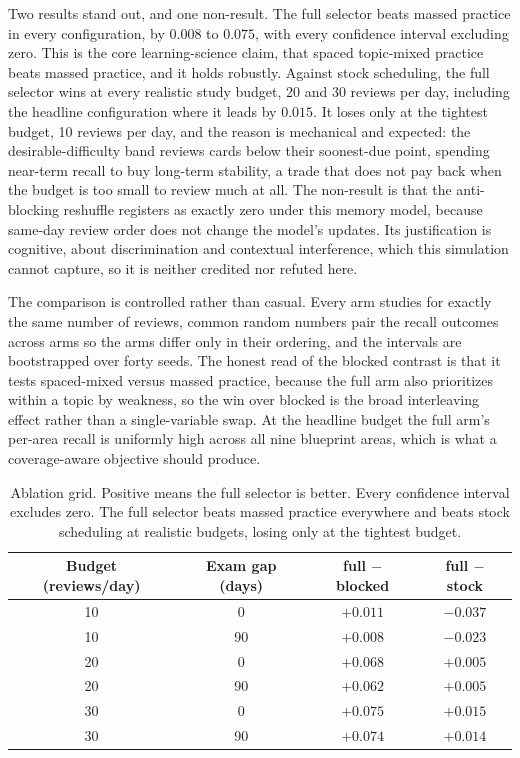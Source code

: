 \documentclass[11pt]{article}
\begin{document}
Two results stand out, and one non-result. The full selector beats massed practice in
every configuration, by $0.008$ to $0.075$, with every confidence interval excluding
zero. This is the core learning-science claim, that spaced topic-mixed practice beats
massed practice, and it holds robustly. Against stock scheduling, the full selector
wins at every realistic study budget, 20 and 30 reviews per day, including the
headline configuration where it leads by $0.015$. It loses only at the tightest
budget, 10 reviews per day, and the reason is mechanical and expected: the
desirable-difficulty band reviews cards below their soonest-due point, spending
near-term recall to buy long-term stability, a trade that does not pay back when the
budget is too small to review much at all. The non-result is that the anti-blocking
reshuffle registers as exactly zero under this memory model, because same-day review
order does not change the model's updates. Its justification is cognitive, about
discrimination and contextual interference, which this simulation cannot capture, so
it is neither credited nor refuted here.

The comparison is controlled rather than casual. Every arm studies for exactly the same
number of reviews, common random numbers pair the recall outcomes across arms so the
arms differ only in their ordering, and the intervals are bootstrapped over forty seeds.
The honest read of the blocked contrast is that it tests spaced-mixed versus massed
practice, because the full arm also prioritizes within a topic by weakness, so the win
over blocked is the broad interleaving effect rather than a single-variable swap. At the
headline budget the full arm's per-area recall is uniformly high across all nine
blueprint areas, which is what a coverage-aware objective should produce.

\begin{table}[t]
\centering
\small
\begin{tabular}{@{}cccc@{}}
\toprule
\textbf{Budget (reviews/day)} & \textbf{Exam gap (days)} & \textbf{full $-$ blocked} & \textbf{full $-$ stock} \\
\midrule
10 & 0  & $+0.011$ & $-0.037$ \\
10 & 90 & $+0.008$ & $-0.023$ \\
20 & 0  & $+0.068$ & $+0.005$ \\
20 & 90 & $+0.062$ & $+0.005$ \\
30 & 0  & $+0.075$ & $+0.015$ \\
30 & 90 & $+0.074$ & $+0.014$ \\
\bottomrule
\end{tabular}
\caption{Ablation grid. Positive means the full selector is better. Every confidence
interval excludes zero. The full selector beats massed practice everywhere and beats
stock scheduling at realistic budgets, losing only at the tightest budget.}
\label{tab:ablation}
\end{table}
\end{document}
